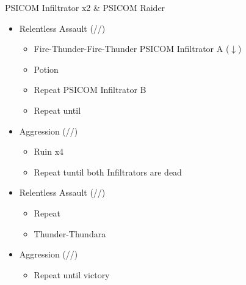 \renewcommand{\fourth}{[4] Relentless Assault (\rav/\rav/\com)}
\renewcommand{\fifth}{[5] Aggression (\com/\rav/\com)}
\begin{battle}[0:42]{PSICOM Infiltrator x2 \& PSICOM Raider}
	\begin{itemize}
		\item \fourth
		      \begin{itemize}
			      \item \begin{flushleft}Fire-Thunder-Fire-Thunder PSICOM Infiltrator A ($\downarrow$)\end{flushleft}
			      \item Potion
			      \item Repeat PSICOM Infiltrator B
			      \item Repeat until \stagger
		      \end{itemize}
		\item \fifth
		      \begin{itemize}
			      \item Ruin x4
			      \item Repeat tuntil both Infiltrators are dead
		      \end{itemize}
		\item \fourth
		      \begin{itemize}
			      \item Repeat
			      \item Thunder-Thundara
			            \stagger
		      \end{itemize}
		\item \fifth
		      \begin{itemize}
			      \item Repeat until victory
		      \end{itemize}
	\end{itemize}
	 
\end{battle}

\renewcommand{\first}{[1] Tide Turner (\syn/\sab)}
\renewcommand{\second}{[2] War and Peace (\com/\med)}
\renewcommand{\third}{[3] Slash \& Burn (\com/\rav)}
\renewcommand{\fourth}{[4] Dualcasting (\rav/\rav)}
\renewcommand{\fifth}{[5] Undermine (\rav/\sab)}
\renewcommand{\sixth}{[6] Divide \& Conquer (\com/\sab)}

